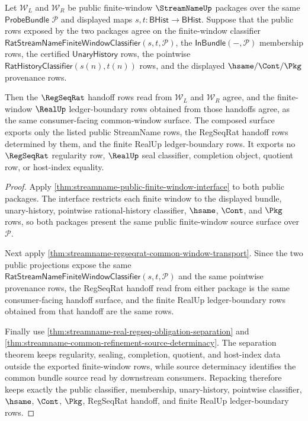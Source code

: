 \begin{theorem}
\label{thm:streamname-public-regseqrat-window-composition}
Let $\mathcal W_L$ and $\mathcal W_R$ be public finite-window $\StreamNameUp$
packages over the same $\mathsf{ProbeBundle}$ $\mathcal P$ and displayed maps
$s,t:\mathsf{BHist}\to\mathsf{BHist}$. Suppose that the public rows exposed by
the two packages agree on the finite-window classifier
$\mathsf{RatStreamNameFiniteWindowClassifier}(s,t,\mathcal P)$, the
$\mathsf{InBundle}(-,\mathcal P)$ membership rows, the certified
$\mathsf{UnaryHistory}$ rows, the pointwise
$\mathsf{RatHistoryClassifier}(s(n),t(n))$ rows, and the displayed
$\hsame/\Cont/\Pkg$ provenance rows.

Then the $\RegSeqRat$ handoff rows read from $\mathcal W_L$ and
$\mathcal W_R$ agree, and the finite-window $\RealUp$ ledger-boundary rows
obtained from those handoffs agree, as the same consumer-facing common-window
surface. The composed surface exports only the listed public StreamName rows,
the RegSeqRat handoff rows determined by them, and the finite RealUp
ledger-boundary rows. It exports no $\RegSeqRat$ regularity row, $\RealUp$
seal classifier, completion object, quotient row, or host-index equality.
\end{theorem}
\begin{proof}
Apply \autoref{thm:streamname-public-finite-window-interface} to both public
packages. The interface restricts each finite window to the displayed bundle,
unary-history, pointwise rational-history classifier, $\hsame$, $\Cont$, and
$\Pkg$ rows, so both packages present the same public finite-window source
surface over $\mathcal P$.

Next apply \autoref{thm:streamname-regseqrat-common-window-transport}. Since
the two public projections expose the same
$\mathsf{RatStreamNameFiniteWindowClassifier}(s,t,\mathcal P)$ and the same
pointwise provenance rows, the RegSeqRat handoff read from either package is
the same consumer-facing handoff surface, and the finite RealUp
ledger-boundary rows obtained from that handoff are the same rows.

Finally use \autoref{thm:streamname-real-regseq-obligation-separation} and
\autoref{thm:streamname-common-refinement-source-determinacy}. The separation
theorem keeps regularity, sealing, completion, quotient, and host-index data
outside the exported finite-window rows, while source determinacy identifies
the common bundle source read by downstream consumers. Repacking therefore
keeps exactly the public classifier, membership, unary-history, pointwise
classifier, $\hsame$, $\Cont$, $\Pkg$, RegSeqRat handoff, and finite RealUp
ledger-boundary rows.
\end{proof}

